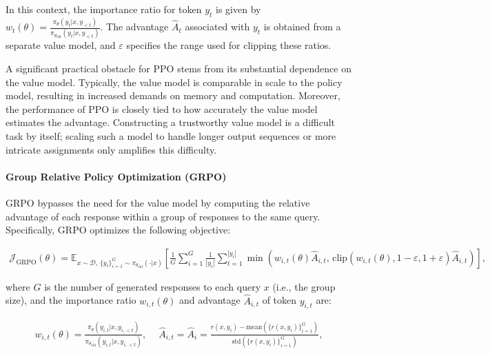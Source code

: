 In this context, the importance ratio for token $y_t$ is given by $
w_{t}(\theta) = \frac{ \pi_{\theta} (y_{t} | x, y_{<t}) }{ \pi_{\theta_\text{old}} (y_{t} | x,y_{<t})} $. The advantage $\widehat{A}_{t}$ associated with $y_t$ is obtained from a separate value model, and $\varepsilon$ specifies the range used for clipping these ratios.

A significant practical obstacle for PPO stems from its substantial dependence on the value model. Typically, the value model is comparable in scale to the policy model, resulting in increased demands on memory and computation. Moreover, the performance of PPO is closely tied to how accurately the value model estimates the advantage. Constructing a trustworthy value model is a difficult task by itself; scaling such a model to handle longer output sequences or more intricate assignments only amplifies this difficulty.

\paragraph{Group Relative Policy Optimization (GRPO)} GRPO \citep{grpo} bypasses the need for the value model by computing the relative advantage of each response within a group of responses to the same query. Specifically, GRPO optimizes the following objective:

\begin{align}
\label{equ:grpo}
\mathcal{J}_\text{GRPO}(\theta) = \mathbb{E}_{ x \sim \mathcal{D},\, \{y_i\}_{i=1}^G \sim \pi_{\theta_\text{old}}( \cdot | x) }
\left[ \frac{1}{G} \sum_{i=1}^{G} \frac{1}{|y_i|} \sum_{t=1}^{|y_i|} 
\min \left( w_{i,t}(\theta) \widehat{A}_{i,t},  \, \mathrm{clip} \left( w_{i,t}(\theta), 1 - {\varepsilon}, 1 + {\varepsilon}\right) \widehat{A}_{i,t} \right)
\right],
\end{align}

where $G$ is the number of generated responses to each query $x$ (i.e., the group size), and the importance ratio $w_{i,t}(\theta)$ and advantage $\widehat{A}_{i,t}$ of token $y_{i,t}$ are:

\begin{align}
    w_{i,t}(\theta)=\frac{ \pi_{\theta} (y_{i,t} | x, y_{i,<t}) }{ \pi_{\theta_\text{old}} (y_{i,t} | x,y_{i,<t})},\quad\ 
    \widehat{A}_{i,t} = \widehat{A}_{i} = \frac{r(x, y_i) - \mathrm{mean} \left( \{ r(x, y_i) \}_{i=1}^G \right) }{ \mathrm{std} \left( \{ r(x, y_i) \}_{i=1}^G \right) },
\end{align}

